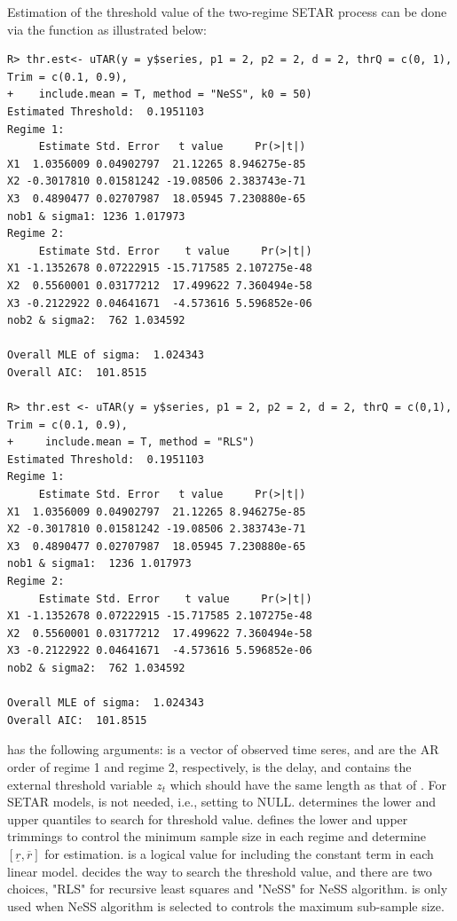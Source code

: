 Estimation of the threshold value of the two-regime SETAR process can be done via the
function  as illustrated below:
\begin{verbatim}
R> thr.est<- uTAR(y = y$series, p1 = 2, p2 = 2, d = 2, thrQ = c(0, 1), Trim = c(0.1, 0.9), 
+    include.mean = T, method = "NeSS", k0 = 50)
Estimated Threshold:  0.1951103 
Regime 1:  
     Estimate Std. Error   t value     Pr(>|t|)
X1  1.0356009 0.04902797  21.12265 8.946275e-85
X2 -0.3017810 0.01581242 -19.08506 2.383743e-71
X3  0.4890477 0.02707987  18.05945 7.230880e-65
nob1 & sigma1: 1236 1.017973 
Regime 2:  
     Estimate Std. Error    t value     Pr(>|t|)
X1 -1.1352678 0.07222915 -15.717585 2.107275e-48
X2  0.5560001 0.03177212  17.499622 7.360494e-58
X3 -0.2122922 0.04641671  -4.573616 5.596852e-06
nob2 & sigma2:  762 1.034592 
  
Overall MLE of sigma:  1.024343 
Overall AIC:  101.8515 

R> thr.est <- uTAR(y = y$series, p1 = 2, p2 = 2, d = 2, thrQ = c(0,1), Trim = c(0.1, 0.9), 
+     include.mean = T, method = "RLS")
Estimated Threshold:  0.1951103 
Regime 1:  
     Estimate Std. Error   t value     Pr(>|t|)
X1  1.0356009 0.04902797  21.12265 8.946275e-85
X2 -0.3017810 0.01581242 -19.08506 2.383743e-71
X3  0.4890477 0.02707987  18.05945 7.230880e-65
nob1 & sigma1:  1236 1.017973 
Regime 2:  
     Estimate Std. Error    t value     Pr(>|t|)
X1 -1.1352678 0.07222915 -15.717585 2.107275e-48
X2  0.5560001 0.03177212  17.499622 7.360494e-58
X3 -0.2122922 0.04641671  -4.573616 5.596852e-06
nob2 & sigma2:  762 1.034592 
  
Overall MLE of sigma:  1.024343 
Overall AIC:  101.8515 
\end{verbatim}
 has the following arguments:  is a vector of observed time seres,  and  are the AR order of regime 1 and regime 2, respectively,  is the delay, and  contains the external threshold variable $z_{t}$ which should have the same length as that of . For SETAR models,  is not needed, i.e., setting  to NULL.  determines the lower and upper quantiles to search for threshold value.  defines the lower and upper trimmings to control the minimum sample size in each regime and determine $[\underline{r}, \overline{r}]$ for estimation.   is a logical value for including
the constant term in each linear model.  decides the way to search the threshold value, and there are two choices, "RLS" for recursive least squares and "NeSS" for NeSS algorithm.  is only used when NeSS algorithm is selected to controls the maximum sub-sample size.


